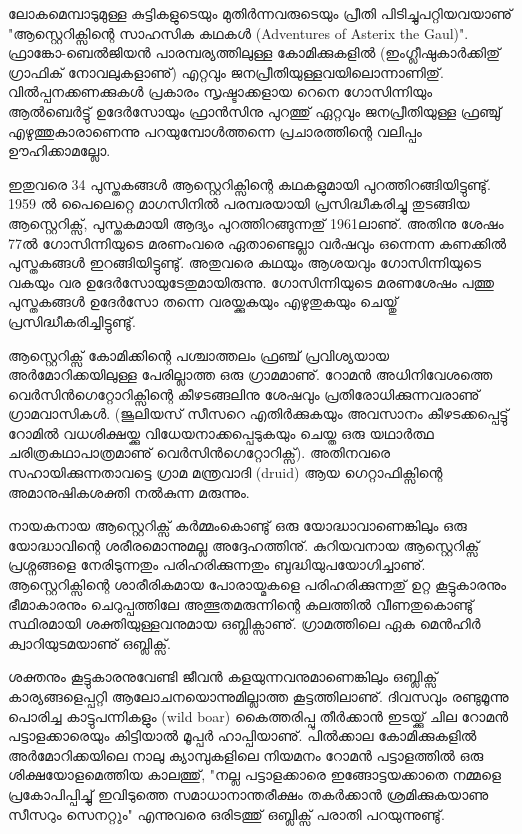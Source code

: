 ﻿
\vskip 2pt

ലോകമെമ്പാടുമുള്ള കുട്ടികളുടെയും മുതിര്‍ന്നവരുടെയും പ്രീതി പിടിച്ചുപറ്റിയവയാണു് "ആസ്റ്റെറിക്സിന്റെ സാഹസിക 
കഥകള്‍ (Adventures of Asterix the Gaul)".  ഫ്രാങ്കോ-ബെല്‍ജിയന്‍ പാരമ്പര്യത്തിലുള്ള കോമിക്കുകളില്‍ 
(ഇംഗ്ലീഷുകാര്‍ക്കിതു് ഗ്രാഫിക് നോവലുകളാണു്) എറ്റവും ജനപ്രീതിയുള്ളവയിലൊന്നാണിതു്. വില്‍പ്പനക്കണക്കുകള്‍ പ്രകാരം 
സൃഷ്ടാക്കളായ റെനെ ഗോസിന്നിയും ആല്‍ബെര്‍ട്ടു് ഉദേര്‍സോയും ഫ്രാന്‍സിനു പുറത്തു് ഏറ്റവും ജനപ്രീതിയുള്ള ഫ്രഞ്ചു് 
എഴുത്തുകാരാണെന്നു പറയുമ്പോള്‍ത്തന്നെ പ്രചാരത്തിന്റെ വലിപ്പം ഊഹിക്കാമല്ലോ.

ഇതുവരെ 34 പുസ്തകങ്ങള്‍ ആസ്റ്റെറിക്സിന്റെ കഥകളുമായി പുറത്തിറങ്ങിയിട്ടുണ്ടു്. 1959 ല്‍ പൈലെറ്റെ മാഗസിനില്‍ 
പരമ്പരയായി പ്രസിദ്ധീകരിച്ചു തുടങ്ങിയ ആസ്റ്റെറിക്സ്, പുസ്തകമായി ആദ്യം പുറത്തിറങ്ങുന്നതു് 1961ലാണു്. അതിനു 
ശേഷം 77ല്‍ ഗോസിന്നിയുടെ മരണംവരെ ഏതാണ്ടെല്ലാ വര്‍ഷവും ഒന്നെന്ന കണക്കില്‍ പുസ്തകങ്ങള്‍ ഇറങ്ങിയിട്ടുണ്ടു്. 
അതുവരെ കഥയും ആശയവും ഗോസിന്നിയുടെ വകയും വര ഉദേര്‍സോയുടേതുമായിരുന്നു. ഗോസിന്നിയുടെ മരണശേഷം 
പത്തു പുസ്തകങ്ങള്‍ ഉദേര്‍സോ തന്നെ വരയ്ക്കുകയും എഴുതുകയും ചെയ്തു് പ്രസിദ്ധീകരിച്ചിട്ടുണ്ടു്.

ആസ്റ്റെറിക്സ് കോമിക്കിന്റെ പശ്ചാത്തലം ഫ്രഞ്ച് പ്രവിശ്യയായ അര്‍മോറിക്കയിലുള്ള പേരില്ലാത്ത ഒരു ഗ്രാമമാണു്. 
റോമന്‍ അധിനിവേശത്തെ വെര്‍സിന്‍ഗെറ്റോറിക്സിന്റെ കീഴടങ്ങലിനു ശേഷവും പ്രതിരോധിക്കുന്നവരാണു് ഗ്രാമവാസികള്‍.
(ജൂലിയസ് സീസറെ എതിര്‍ക്കുകയും അവസാനം കീഴടക്കപ്പെട്ടു് റോമില്‍ വധശിക്ഷയ്ക്കു വിധേയനാക്കപ്പെടുകയും ചെയ്ത 
ഒരു യഥാര്‍ത്ഥ ചരിത്രകഥാപാത്രമാണു് വെര്‍സിന്‍ഗെറ്റോറിക്സ്). അതിനവരെ സഹായിക്കുന്നതാവട്ടെ ഗ്രാമ 
മന്ത്രവാദി (druid) ആയ ഗെറ്റാഫിക്സിന്റെ അമാനുഷികശക്തി നല്‍കുന്ന മരുന്നും.

നായകനായ ആസ്റ്റെറിക്സ് കര്‍മ്മംകൊണ്ടു് ഒരു യോദ്ധാവാണെങ്കിലും ഒരു യോദ്ധാവിന്റെ ശരീരമൊന്നുമല്ല അദ്ദേഹത്തിനു്. 
കുറിയവനായ ആസ്റ്റെറിക്സ് പ്രശ്നങ്ങളെ നേരിടുന്നതും പരിഹരിക്കുന്നതും ബുദ്ധിയുപയോഗിച്ചാണു്. ആസ്റ്റെറിക്സിന്റെ 
ശാരീരികമായ പോരായ്മകളെ പരിഹരിക്കുന്നതു് ഉറ്റ കൂട്ടുകാരനും ഭീമാകാരനും ചെറുപ്പത്തിലേ അത്ഭുതമരുന്നിന്റെ 
കലത്തില്‍ വീണതുകൊണ്ടു് സ്ഥിരമായി ശക്തിയുള്ളവനുമായ ഒബ്ലിക്സാണു്. ഗ്രാമത്തിലെ ഏക മെന്‍ഹിര്‍ 
ക്വാറിയുടമയാണു് ഒബ്ലിക്സ്.


ശക്തനും കൂട്ടുകാരനുവേണ്ടി ജീവന്‍ കളയുന്നവനുമാണെങ്കിലും ഒബ്ലിക്സ് കാര്യങ്ങളെപ്പറ്റി ആലോചനയൊന്നുമില്ലാത്ത 
കൂട്ടത്തിലാണു്. ദിവസവും രണ്ടുമൂന്നു പൊരിച്ച കാട്ടുപന്നികളും (wild boar) കൈത്തരിപ്പു തീര്‍ക്കാന്‍ ഇടയ്ക്കു് ചില റോമന്‍ 
പട്ടാളക്കാരെയും കിട്ടിയാല്‍ മൂപ്പര്‍ ഹാപ്പിയാണു്. പില്‍ക്കാല കോമിക്കുകളില്‍ അര്‍മോറിക്കയിലെ നാലു ക്യാമ്പുകളിലെ 
നിയമനം റോമന്‍ പട്ടാളത്തില്‍ ഒരു ശിക്ഷയോളമെത്തിയ കാലത്തു്, "നല്ല പട്ടാളക്കാരെ ഇങ്ങോട്ടയക്കാതെ നമ്മളെ 
പ്രകോപിപ്പിച്ചു് ഇവിടുത്തെ സമാധാനാന്തരീക്ഷം തകര്‍ക്കാന്‍ ശ്രമിക്കുകയാണു സീസറും സെനറ്റും" എന്നുവരെ ഒരിടത്തു് 
ഒബ്ലിക്സ് പരാതി പറയുന്നുണ്ടു്.

